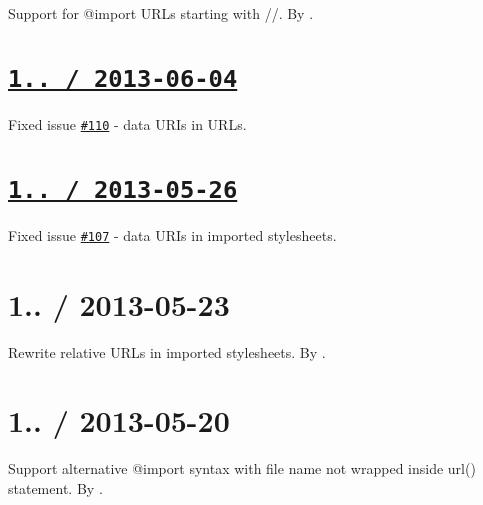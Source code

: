 \begin{DoxyItemize}
\item Support for {\ttfamily @import} U\+R\+Ls starting with {\ttfamily //}. By \href{https://github.com/petetak}{\tt }.
\end{DoxyItemize}

\section*{\href{https://github.com/jakubpawlowicz/clean-css/compare/v1.0.5...v1.0.6}{\tt 1.. / 2013-\/06-\/04} }


\begin{DoxyItemize}
\item Fixed issue \href{https://github.com/jakubpawlowicz/clean-css/issues/110}{\tt \#110} -\/ data U\+R\+Is in U\+R\+Ls.
\end{DoxyItemize}

\section*{\href{https://github.com/jakubpawlowicz/clean-css/compare/v1.0.4...v1.0.5}{\tt 1.. / 2013-\/05-\/26} }


\begin{DoxyItemize}
\item Fixed issue \href{https://github.com/jakubpawlowicz/clean-css/issues/107}{\tt \#107} -\/ data U\+R\+Is in imported stylesheets.
\end{DoxyItemize}

\section*{1.. / 2013-\/05-\/23 }


\begin{DoxyItemize}
\item Rewrite relative U\+R\+Ls in imported stylesheets. By \href{https://github.com/bluej100}{\tt }.
\end{DoxyItemize}

\section*{1.. / 2013-\/05-\/20 }


\begin{DoxyItemize}
\item Support alternative {\ttfamily @import} syntax with file name not wrapped inside {\ttfamily url()} statement. By \href{https://github.com/bluej100}{\tt }.
\end{DoxyItemize}


